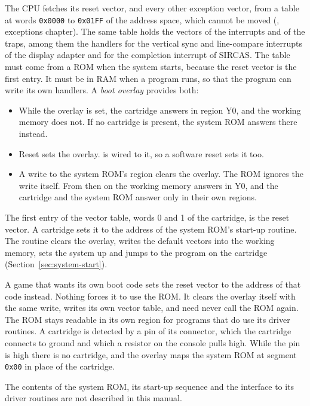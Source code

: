 The CPU fetches its reset vector, and every other exception vector, from a table at words \texttt{0x0000} to
\texttt{0x01FF} of the address space, which cannot be moved (\archmanual{}, exceptions chapter). The same table holds
the vectors of the interrupts and of the traps, among them the handlers for the vertical sync and line-compare
interrupts of the display adapter and for the completion interrupt of SIRCAS. The table must come from a ROM when the
system starts, because the reset vector is the first entry. It must be in RAM when a program runs, so that the program
can write its own handlers. A \emph{boot overlay} provides both:

\begin{itemize}
	\item While the overlay is set, the cartridge answers in region Y0, and the working memory does not. If no cartridge is
	      present, the system ROM answers there instead.
	\item Reset sets the overlay.  is wired to it, so a software reset sets it too.
	\item A write to the system ROM's region clears the overlay. The ROM ignores the write itself. From then on the working
	      memory answers in Y0, and the cartridge and the system ROM answer only in their own regions.
\end{itemize}

The first entry of the vector table, words 0 and 1 of the cartridge, is the reset vector. A cartridge sets it to the
address of the system ROM's start-up routine. The routine clears the overlay, writes the default vectors into the
working memory, sets the system up and jumps to the program on the cartridge (Section~\ref{sec:system-start}).

A game that wants its own boot code sets the reset vector to the address of that code instead. Nothing forces it to use
the ROM. It clears the overlay itself with the same write, writes its own vector table, and need never call the ROM
again. The ROM stays readable in its own region for programs that do use its driver routines. A cartridge is detected
by a pin of its connector, which the cartridge connects to ground and which a resistor on the console pulls high. While
the pin is high there is no cartridge, and the overlay maps the system ROM at segment \texttt{0x00} in place of the
cartridge.

The contents of the system ROM, its start-up sequence and the interface to its driver routines are not described in
this manual.

